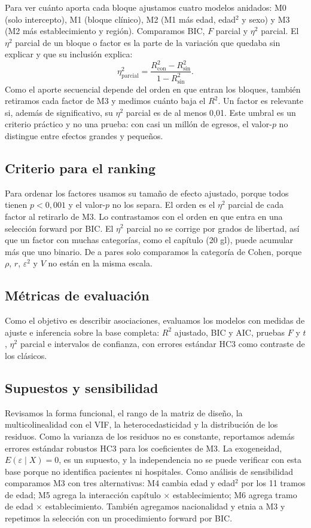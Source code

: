 \documentclass[10.5pt,a4paper,headings=small,abstract=false,bibliography=totoc,listof=totoc]{scrartcl}
\begin{document}
Para ver cuánto aporta cada bloque ajustamos cuatro modelos anidados: M0 (solo intercepto), M1 (bloque clínico), M2 (M1 más edad, edad$^2$ y sexo) y M3 (M2 más establecimiento y región). Comparamos BIC, $F$ parcial y $\eta^2$ parcial. El $\eta^2$ parcial de un bloque o factor es la parte de la variación que quedaba sin explicar y que su inclusión explica:
\[
\eta^2_{\text{parcial}}=\frac{R^2_{\text{con}}-R^2_{\text{sin}}}{1-R^2_{\text{sin}}}.
\]
Como el aporte secuencial depende del orden en que entran los bloques, también retiramos cada factor de M3 y medimos cuánto baja el $R^2$. Un factor es relevante si, además de significativo, su $\eta^2$ parcial es de al menos 0,01. Este umbral es un criterio práctico y no una prueba: con casi un millón de egresos, el valor-$p$ no distingue entre efectos grandes y pequeños.

\subsection{Criterio para el ranking}

Para ordenar los factores usamos su tamaño de efecto ajustado, porque todos tienen $p<0{,}001$ y el valor-$p$ no los separa. El orden es el $\eta^2$ parcial de cada factor al retirarlo de M3. Lo contrastamos con el orden en que entra en una selección forward por BIC. El $\eta^2$ parcial no se corrige por grados de libertad, así que un factor con muchas categorías, como el capítulo (20 gl), puede acumular más que uno binario. De a pares solo comparamos la categoría de Cohen, porque $\rho$, $r$, $\varepsilon^2$ y $V$ no están en la misma escala.

\subsection{Métricas de evaluación}

Como el objetivo es describir asociaciones, evaluamos los modelos con medidas de ajuste e inferencia sobre la base completa: $R^2$ ajustado, BIC y AIC, pruebas $F$ y $t$, $\eta^2$ parcial e intervalos de confianza, con errores estándar HC3 como contraste de los clásicos.

\subsection{Supuestos y sensibilidad}

Revisamos la forma funcional, el rango de la matriz de diseño, la multicolinealidad con el VIF, la heterocedasticidad y la distribución de los residuos. Como la varianza de los residuos no es constante, reportamos además errores estándar robustos HC3 \citep{long2000} para los coeficientes de M3. La exogeneidad, $E(\varepsilon\mid X)=0$, es un supuesto, y la independencia no se puede verificar con esta base porque no identifica pacientes ni hospitales. Como análisis de sensibilidad comparamos M3 con tres alternativas: M4 cambia edad y edad$^2$ por los 11 tramos de edad; M5 agrega la interacción capítulo $\times$ establecimiento; M6 agrega tramo de edad $\times$ establecimiento. También agregamos nacionalidad y etnia a M3 y repetimos la selección con un procedimiento forward por BIC.
\end{document}
